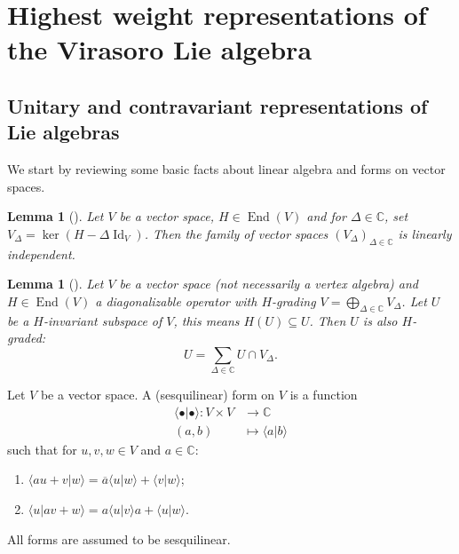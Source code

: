 \documentclass[a4paper, 12pt, reqno]{amsart}
\newtheorem{lemma}[theorem]{Lemma}
\theoremstyle{remark}
\numberwithin{equation}{subsection}
\DeclareMathOperator{\Id}{Id}
\DeclareMathOperator{\End}{End}
\begin{document}
\section{Highest weight representations of the Virasoro Lie algebra}
\label{sec:high-weight-repr}

\subsection{Unitary and contravariant representations of Lie algebras}
\label{sec:unit-contr-repr}

We start by reviewing some basic facts about linear algebra and forms on vector spaces.

\begin{lemma}[{\cite[\S6.2]{hoffman_linear_1971}}]
  \label{lmm:11}
  Let $V$ be a vector space, $H \in \End(V)$ and for $\Delta \in \mathbb{C}$, set $V_{\Delta} = \ker(H - \Delta\Id_V)$.
  Then the family of vector spaces $(V_{\Delta})_{\Delta \in \mathbb{C}}$ is linearly independent.
\end{lemma}

\begin{lemma}[{\cite[Corollary 1.1]{kac_bombay_2013}}]
  \label{lmm:12}
  Let $V$ be a vector space (not necessarily a vertex algebra) and $H \in \End(V)$ a diagonalizable operator with $H$-grading $V = \bigoplus_{\Delta \in \mathbb{C}}V_{\Delta}$.
  Let $U$ be a $H$-invariant subspace of $V$, this means $H(U) \subseteq U$.
  Then $U$ is also $H$-graded:
  \begin{equation*}
    U = \sum_{\Delta \in \mathbb{C}}U \cap V_{\Delta}.
  \end{equation*}
\end{lemma}

Let $V$ be a vector space.
A (sesquilinear) form on $V$ is a function
\begin{align*}
  \langle \bullet| \bullet\rangle: V \times V &\to \mathbb{C} \\
  (a, b) &\mapsto \langle a| b\rangle
\end{align*}
such that for $u, v, w \in V$ and $a \in \mathbb{C}$:
\begin{enumerate}
\item $\langle au + v| w\rangle = \overline{a}\langle u| w\rangle + \langle v| w\rangle$;
\item $\langle u| av + w\rangle = a\langle u| v\rangle a + \langle u| w\rangle$.
\end{enumerate}
All forms are assumed to be sesquilinear.
\end{document}
